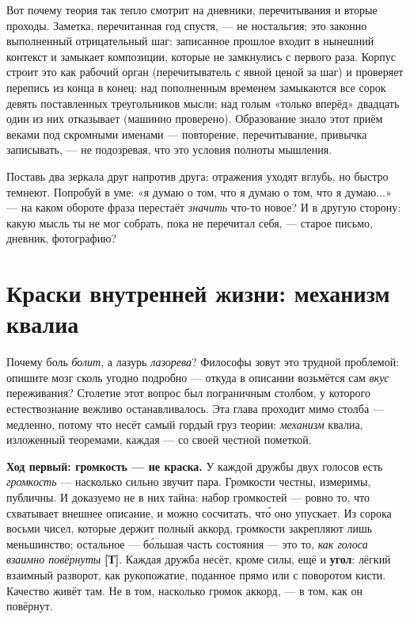 \documentclass[11pt,letterpaper]{article}
\newcommand{\stT}{\textbf{[Т]}\xspace}
\begin{document}
Вот почему теория так тепло смотрит на дневники, перечитывания и
вторые проходы. Заметка, перечитанная год спустя, --- не
ностальгия; это законно выполненный отрицательный шаг: записанное
прошлое входит в нынешний контекст и замыкает композиции, которые
не замкнулись с первого раза. Корпус строит это как рабочий орган
(перечитыватель с явной ценой за шаг) и проверяет перепись из конца
в конец: над пополненным временем замыкаются все сорок девять
поставленных треугольников мысли; над голым «только вперёд»
двадцать один из них отказывает (машинно проверено). Образование
знало этот приём веками под скромными именами --- повторение,
перечитывание, привычка записывать, --- не подозревая, что это
условия полноты мышления.

\begin{askbox}
Поставь два зеркала друг напротив друга: отражения уходят вглубь, но
быстро темнеют. Попробуй в уме: «я думаю о том, что я думаю о том,
что я думаю...» --- на каком обороте фраза перестаёт \emph{значить}
что-то новое? И в другую сторону: какую мысль ты не мог собрать,
пока не перечитал себя, --- старое письмо, дневник, фотографию?
\end{askbox}

\section{Краски внутренней жизни: механизм квалиа}
\label{sec:qualia}

Почему боль \emph{болит}, а лазурь \emph{лазорева}? Философы зовут
это трудной проблемой: опишите мозг сколь угодно подробно ---
откуда в описании возьмётся сам \emph{вкус} переживания? Столетие
этот вопрос был пограничным столбом, у которого естествознание
вежливо останавливалось. Эта глава проходит мимо столба --- медленно,
потому что несёт самый гордый груз теории: \emph{механизм} квалиа,
изложенный теоремами, каждая --- со своей честной пометкой.

\textbf{Ход первый: громкость --- не краска.} У каждой дружбы двух
голосов есть \emph{громкость} --- насколько сильно звучит пара.
Громкости честны, измеримы, публичны. И доказуемо не в них тайна:
набор громкостей --- ровно то, что схватывает внешнее описание, и
можно сосчитать, что́ оно упускает. Из сорока восьми чисел, которые
держит полный аккорд, громкости закрепляют лишь меньшинство;
остальное --- бо́льшая часть состояния --- это то, \emph{как голоса
взаимно повёрнуты} \stT. Каждая дружба несёт, кроме силы, ещё и
\textbf{угол}: лёгкий взаимный разворот, как рукопожатие, поданное
прямо или с поворотом кисти. Качество живёт там. Не в том, насколько
громок аккорд, --- в том, как он повёрнут.
\end{document}

